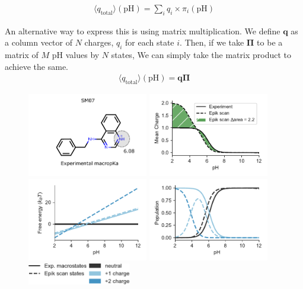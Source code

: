 \documentclass[9pt,lineno,final]{elife}
\newcommand{\pH}{\mathrm{pH}}
\begin{document}
\begin{eqnarray}
	\langle q_\text{total} \rangle (\pH) = \sum_i q_i \times \pi_i(\pH) 
\end{eqnarray}

An alternative way to express this is using matrix multiplication.
%
We define $\mathbf{q}$ as a column vector of $N$ charges, $q_i$ for each state $i$.
%
Then, if we take $\boldsymbol{\Pi}$ to be a matrix of $M$ pH values by $N$ states,
%
We can simply take the matrix product to achieve the same.
\begin{align}
    \langle q_\text{total} \rangle (\pH) = \mathbf{q} \boldsymbol{\Pi} 
\end{align}

\begin{figure}[H]
	\centering
	
	\includegraphics[width=0.47\textwidth]{Images/Molecules/SM07-pka.pdf} \hfill
	\includegraphics[width=0.47\textwidth]{fig2_charge_sm07.pdf} \\
	
    \includegraphics[width=0.47\textwidth]{fig2_free_energy_sm07.pdf}
    \hfill
	\includegraphics[width=0.47\textwidth]{fig2_population_sm07.pdf}\\
 	\includegraphics[width=0.4\textwidth]{fig2_legend}
	

\end{figure}
\end{document}
